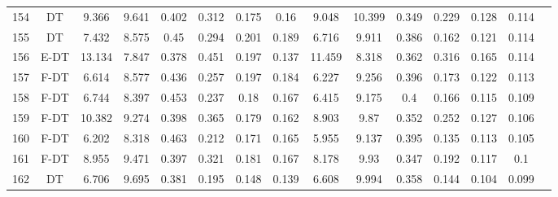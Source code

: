 \begin{longtable}{@{\hskip3pt}c@{\hskip3pt}c@{\hskip3pt}c@{\hskip3pt}c@{\hskip3pt}c@{\hskip3pt}c@{\hskip3pt}c@{\hskip3pt}c@{\hskip3pt}c@{\hskip3pt}c@{\hskip3pt}c@{\hskip3pt}c@{\hskip3pt}c@{\hskip3pt}c@{\hskip3pt}c}
        154 &             DT &             9.366 &          9.641 &           0.402 &           0.312 &           0.175 &            0.16 &               9.048 &          10.399 &           0.349 &         0.229 &          0.128 &           0.114 \\
        155 &             DT &             7.432 &          8.575 &            0.45 &           0.294 &           0.201 &           0.189 &               6.716 &           9.911 &           0.386 &         0.162 &          0.121 &           0.114 \\
        156 &           E-DT &            13.134 &          7.847 &           0.378 &           0.451 &           0.197 &           0.137 &              11.459 &           8.318 &           0.362 &         0.316 &          0.165 &           0.114 \\
        157 &           F-DT &             6.614 &          8.577 &           0.436 &           0.257 &           0.197 &           0.184 &               6.227 &           9.256 &           0.396 &         0.173 &          0.122 &           0.113 \\
        158 &           F-DT &             6.744 &          8.397 &           0.453 &           0.237 &            0.18 &           0.167 &               6.415 &           9.175 &             0.4 &         0.166 &          0.115 &           0.109 \\
        159 &           F-DT &            10.382 &          9.274 &           0.398 &           0.365 &           0.179 &           0.162 &               8.903 &            9.87 &           0.352 &         0.252 &          0.127 &           0.106 \\
        160 &           F-DT &             6.202 &          8.318 &           0.463 &           0.212 &           0.171 &           0.165 &               5.955 &           9.137 &           0.395 &         0.135 &          0.113 &           0.105 \\
        161 &           F-DT &             8.955 &          9.471 &           0.397 &           0.321 &           0.181 &           0.167 &               8.178 &            9.93 &           0.347 &         0.192 &          0.117 &             0.1 \\
        162 &             DT &             6.706 &          9.695 &           0.381 &           0.195 &           0.148 &           0.139 &               6.608 &           9.994 &           0.358 &         0.144 &          0.104 &           0.099 \\

\end{longtable}
